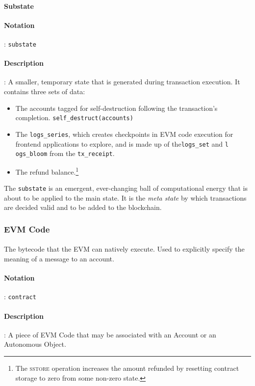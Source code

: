 \documentclass[10pt,a4paper,leqno,bibliography=totoc]{scrartcl}
\newenvironment{alphafootnotes}
{\par\edef\savedfootnotenumber{\number\value{footnote}}
\renewcommand{\thefootnote}{\alph{footnote}}
\setcounter{footnote}{0}}
{\par\setcounter{footnote}{\savedfootnotenumber}}
\begin{document}
\begin{alphafootnotes}
\begin{multicols*}{2}
				\paragraph{Substate}
				
				\paragraph{Notation}: \texttt{substate}
				\paragraph{Description}: A smaller, temporary state that is generated during transaction execution. It contains three sets of data:
				
				\begin{itemize}
					\item The accounts tagged for self-destruction following the transaction's completion. \texttt{self\_destruct(accounts)}
					\item The \texttt{logs\_series}, which creates checkpoints in EVM code execution for frontend applications to explore, and is made up of the\texttt{logs\_set} and \texttt{l
						ogs\_bloom} from the \texttt{tx\_receipt}.
					\item The refund balance.\footnote{The \textsc{sstore} operation increases the amount refunded by resetting contract storage to zero from some non-zero state.}
				\end{itemize}
				
					The \texttt{substate} is an emergent, ever-changing ball of computational energy that is about to be applied to the main state. It is the \textit{meta state} by which transactions are decided valid and to be added to the blockchain.
		
			\subsubsection{EVM Code}
				\paragraph{}The bytecode that the EVM can natively execute. Used to explicitly specify the meaning of a message to an account.
				\paragraph{Notation}: \texttt{contract}
				\paragraph{Description}: A piece of EVM Code that may be associated with an Account or an Autonomous Object. 

\end{multicols*}
\end{alphafootnotes}
\end{document}
